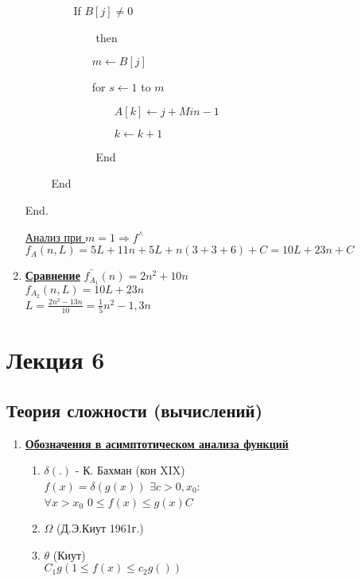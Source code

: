 \documentclass[12pt]{report}
\begin{document}
\begin{enumerate}
		$\qquad\qquad$ If $B[j] \neq 0$\par
		$\qquad\qquad\qquad$ then\par
		$\qquad\qquad\qquad m \leftarrow B[j]$\par
		$\qquad\qquad\qquad$for $s \leftarrow 1$ to $m$\par
		$\qquad\qquad\qquad\qquad A[k] \leftarrow j + Min - 1$\par
		$\qquad\qquad\qquad\qquad k \leftarrow k + 1$\par
		$\qquad\qquad\qquad$ End\par
		$\qquad$ End\par
		End.\par
		
		\underline{Анализ при $m=1 \Rightarrow f^{\wedge}$}\\
		$f_A(n, L) = 5L + 11n + 5L + n(3 + 3 + 6) + C = 10L + 23n + C$\par
		
		\item \textbf{\underline{Сравнение}}
		$\bar{f_{A_1}}(n) = 2n^2 + 10n$\\
		$f_{A_2}(n,L) = 10L + 23n$\\
		$L = \frac{2n^2 - 13n}{10} = \frac{1}{5}n^2 - 1,3n$
	\end{enumerate}
	
	\chapter*{Лекция 6}
	\section*{Теория сложности (вычислений)}
	\begin{enumerate}
		\item \textbf{\underline{Обозначения в асимптотическом анализа функций}}\par
		\begin{enumerate}
			\item $\delta(.)$ - К. Бахман (кон XIX)\\
			$f(x)=\delta(g(x))$ $\exists c > 0, x_0:$\\
			$\forall x > x_0$ $0 \leq f(x) \leq g(x) C$\\
			\item $\Omega$ (Д.Э.Киут 1961г.)\\
			\item $\theta$ (Киут)\\
			$C_1 g(1 \leq f(x) \leq c_2 g())$\\
		\end{enumerate}
	\end{enumerate}
\end{document}
